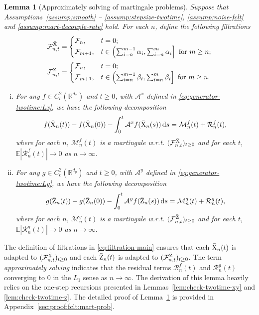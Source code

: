 \documentclass[11pt]{article}
\theoremstyle{plain}
\newtheorem{lem}{Lemma}[section]
\theoremstyle{definition}
\def\d{\mathrm{d}}
\def\MM{{\mathcal M}}
\def\AM{{\mathcal A}}
\def\FM{{\mathcal F}}
\def\RM{{\mathcal R}}
\def\RB{{\mathbb R}}
\def\EB{{\mathbb E}}
\newcommand{\xbar}{{\bar{\textnormal{X}}}}
\newcommand{\zbar}{{\bar{\textnormal{Z}}}}
\begin{document}
\begin{lem}[Approximately solving of martingale problems]\label{lem:mart-prob-twotime}
Suppose that Assumptions~\ref{assump:smooth} -- \ref{assump:stepsize-twotime}, \ref{assump:noise-fclt} and \ref{assump:mart-decouple-rate} hold.
For each $n$, define the following filtrations
\begin{align}\label{eq:filtration-main}
	\begin{split}
	\FM^\xbar_{n,t} & = \begin{cases}
		\FM_{n}, &  t = 0; \\
		\FM_{m+1}, & t \in \left( \sum_{i=n}^{m-1} \alpha_{i}, \sum_{i=n}^{m} \alpha_{i} \right] \text{ for } m \ge n;
	\end{cases} \\
	\FM^\zbar_{n,t} & = \begin{cases}
		\FM_{n}, &  t = 0; \\
		\FM_{m+1}, & t \in \left( \sum_{i=n}^{m-1} \beta_{i}, \sum_{i=n}^{m} \beta_{i} \right] \text{ for } m \ge n.
	\end{cases} 
	\end{split}
\end{align}
\begin{enumerate}[(i)]
    \item  For any $f \in C^2_c(\RB^{d_x})$ and $t \ge 0$, with $\AM^x$ defined in \eqref{eq:generator-twotime:Lx}, we have the following decomposition
    \begin{equation*}
    f(\xbar_{n}(t)) - f(\xbar_{n}(0)) - \int_0^{t} \AM^x f(\xbar_{n}(s))\, \d s
    = \MM_{n}^f(t) + \RM_{n}^f(t), 
    \end{equation*}
    where for each $n$, $\MM_{n}^f(t)$ is a martingale w.r.t. $(\FM^\xbar_{n,t} )_{t \ge 0}$ and for each $t$, $\EB | \RM_{n}^f(t) | \to 0$ as $n \to \infty$. 
    \item For any $g \in C^2_c(\RB^{d_y})$ and $t \ge 0$, with $\AM^y$ defined in \eqref{eq:generator-twotime:Ly}, we have the following decomposition
    \begin{equation*}
    g(\zbar_{n}(t)) - g(\zbar_{n}(0)) - \int_0^{t} \AM^y f(\zbar_{n}(s))\, \d s
    = \MM_{n}^g(t) + \RM_{n}^g(t), 
    \end{equation*}
    where for each $n$, $\MM_{n}^g(t)$ is a martingale w.r.t. $( \FM^\zbar_{n,t})_{t \ge 0}$ and for each $t$, $\EB | \RM_{n}^g(t) | \to 0$ as $n \to \infty$.
\end{enumerate}
\end{lem}
The definition of filtrations in \eqref{eq:filtration-main} ensures that  each $\xbar_{n}(t)$ is adapted to $(\FM^\xbar_{n.t})_{t \ge 0}$ and each $\zbar_{n}(t)$ is adapted to $(\FM^\zbar_{n,t})_{t \ge 0}$.
The term \textit{approximately solving} indicates that the residual terms $\RM_{n}^f(t)$ and $\RM_{n}^g(t)$ converging to $0$ in the $L_1$ sense as $n \to \infty$.
The derivation of this lemma heavily relies on the one-step recursions presented in Lemmas~\ref{lem:check-twotime-xy} and \ref{lem:check-twotime-z}. The detailed proof of Lemma~\ref{lem:mart-prob-twotime} is provided in Appendix~\ref{sec:proof:fclt:mart-prob}.
\end{document}
